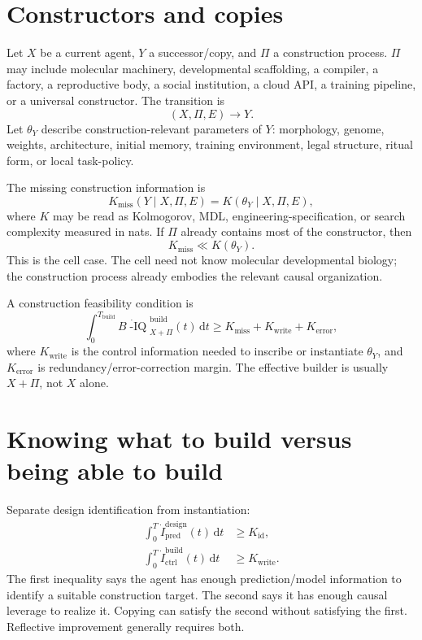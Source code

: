 \documentclass[11pt]{article}
\newcommand{\Biq}{B\!\operatorname{-IQ}}
\newcommand{\dd}{\mathrm{d}}
\begin{document}
\section{Constructors and copies}

Let $X$ be a current agent, $Y$ a successor/copy, and $\Pi$ a construction process. $\Pi$ may include molecular machinery, developmental scaffolding, a compiler, a factory, a reproductive body, a social institution, a cloud API, a training pipeline, or a universal constructor. The transition is
\begin{equation}
  (X,\Pi,E) \longrightarrow Y.
\end{equation}
Let $\theta_Y$ describe construction-relevant parameters of $Y$: morphology, genome, weights, architecture, initial memory, training environment, legal structure, ritual form, or local task-policy.

The missing construction information is
\begin{equation}
  K_{\mathrm{miss}}(Y\mid X,\Pi,E)=K(\theta_Y\mid X,\Pi,E),
\end{equation}
where $K$ may be read as Kolmogorov, MDL, engineering-specification, or search complexity measured in nats. If $\Pi$ already contains most of the constructor, then
\begin{equation}
  K_{\mathrm{miss}}\ll K(\theta_Y).
\end{equation}
This is the cell case. The cell need not know molecular developmental biology; the construction process already embodies the relevant causal organization.

A construction feasibility condition is
\begin{equation}
  \int_0^{T_{\mathrm{build}}}\dot{\Biq}_{X+\Pi}^{\mathrm{build}}(t)\,\dd t
  \ge
  K_{\mathrm{miss}}+K_{\mathrm{write}}+K_{\mathrm{error}},
\end{equation}
where $K_{\mathrm{write}}$ is the control information needed to inscribe or instantiate $\theta_Y$, and $K_{\mathrm{error}}$ is redundancy/error-correction margin. The effective builder is usually $X+\Pi$, not $X$ alone.

\section{Knowing what to build versus being able to build}

Separate design identification from instantiation:
\begin{align}
  \int_0^T \dot I^{\mathrm{design}}_{\mathrm{pred}}(t)\,\dd t &\ge K_{\mathrm{id}},\\
  \int_0^T \dot I^{\mathrm{build}}_{\mathrm{ctrl}}(t)\,\dd t &\ge K_{\mathrm{write}}.
\end{align}
The first inequality says the agent has enough prediction/model information to identify a suitable construction target. The second says it has enough causal leverage to realize it. Copying can satisfy the second without satisfying the first. Reflective improvement generally requires both.
\end{document}
